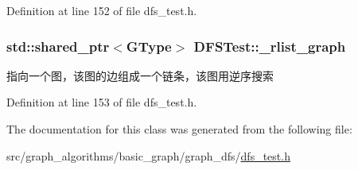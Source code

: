 Definition at line 152 of file dfs\+\_\+test.\+h.

\hypertarget{class_d_f_s_test_a93a79d0654eb82517990c8f5419148a8}{}
\subsubsection[{\+\_\+rlist\+\_\+graph}]{\setlength{\rightskip}{0pt plus 5cm}std\+::shared\+\_\+ptr$<${\bf G\+Type}$>$ D\+F\+S\+Test\+::\+\_\+rlist\+\_\+graph\hspace{0.3cm}{\ttfamily [protected]}}\label{class_d_f_s_test_a93a79d0654eb82517990c8f5419148a8}
指向一个图，该图的边组成一个链条，该图用逆序搜索 

Definition at line 153 of file dfs\+\_\+test.\+h.



The documentation for this class was generated from the following file\+:\begin{DoxyCompactItemize}
\item 
src/graph\+\_\+algorithms/basic\+\_\+graph/graph\+\_\+dfs/\hyperlink{dfs__test_8h}{dfs\+\_\+test.\+h}\end{DoxyCompactItemize}
